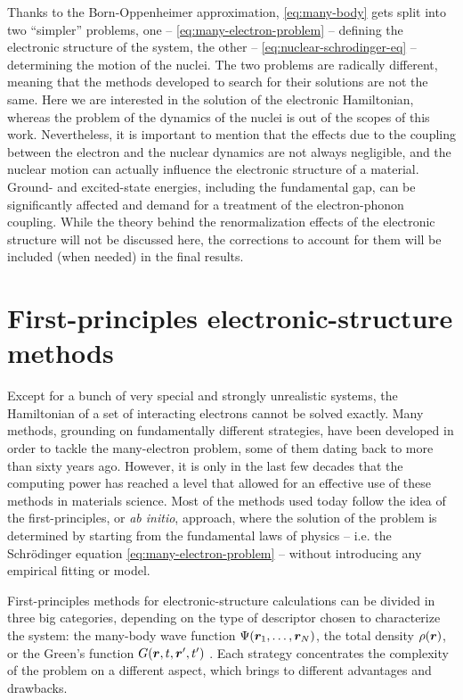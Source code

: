 Thanks to the Born-Oppenheimer approximation, \cref{eq:many-body} gets split into two ``simpler'' problems, one -- \cref{eq:many-electron-problem} -- defining the electronic structure of the system, the other -- \cref{eq:nuclear-schrodinger-eq} -- determining the motion of the nuclei. The two problems are radically different, meaning that the methods developed to search for their solutions are not the same. Here we are interested in the solution of the electronic Hamiltonian, whereas the problem of the dynamics of the nuclei is out of the scopes of this work. Nevertheless, it is important to mention that the effects due to the coupling between the electron and the nuclear dynamics are not always negligible, and the nuclear motion can actually influence the electronic structure of a material. Ground- and excited-state energies, including the fundamental gap, can be significantly affected and demand for a treatment of the electron-phonon coupling. While the theory behind the renormalization effects of the electronic structure will not be discussed here, the corrections to account for them will be included (when needed) in the final results.

\section{First-principles electronic-structure methods\label{sec:first-principles-methods}}
Except for a bunch of very special and strongly unrealistic systems, the Hamiltonian of a set of interacting electrons cannot be solved exactly. Many methods, grounding on fundamentally different strategies, have been developed in order to tackle the many-electron problem, some of them dating back to more than sixty years ago. However, it is only in the last few decades that the computing power has reached a level that allowed for an effective use of these methods in materials science. Most of the methods used today follow the idea of the first-principles, or \emph{ab initio}, approach, where the solution of the problem is determined by starting from the fundamental laws of physics -- i.e. the Schr\"{o}dinger equation \eqref{eq:many-electron-problem} -- without introducing any empirical fitting or model.

First-principles methods for electronic-structure calculations can be divided in three big categories, depending on the type of descriptor chosen to characterize the system: the many-body wave function $\Psi({\bm r}_1, \dots, {\bm r}_N)$, the total density $\rho({\bm r})$, or the Green's function $G({\bm r},t,{\bm r}',t')$ \cite{marzari_electronic-structure_2021}. Each strategy concentrates the complexity of the problem on a different aspect, which brings to different advantages and drawbacks.

